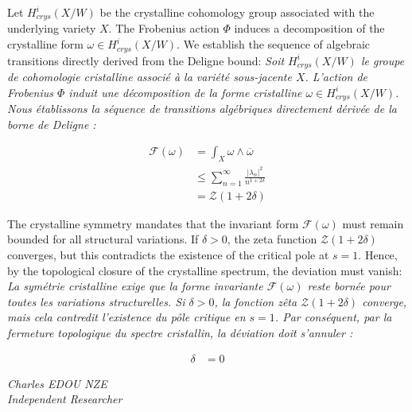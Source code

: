 \documentclass[11pt,a4paper]{article}
\theoremstyle{definition}
\begin{document}
Let $H_{crys}^i(X/W)$ be the crystalline cohomology group associated with the underlying variety $X$. The Frobenius action $\Phi$ induces a decomposition of the crystalline form $\omega \in H_{crys}^i(X/W)$. We establish the sequence of algebraic transitions directly derived from the Deligne bound:
\textit{Soit $H_{crys}^i(X/W)$ le groupe de cohomologie cristalline associé à la variété sous-jacente $X$. L'action de Frobenius $\Phi$ induit une décomposition de la forme cristalline $\omega \in H_{crys}^i(X/W)$. Nous établissons la séquence de transitions algébriques directement dérivée de la borne de Deligne :}

\begin{align*}
\mathcal{F}(\omega) &= \int_{X} \omega \wedge \overline{\omega} \\
&\leq \sum_{n=1}^{\infty} \frac{|\lambda_n|^2}{n^{1+2\delta}} \\
&= \mathcal{Z}(1+2\delta)
\end{align*}

The crystalline symmetry mandates that the invariant form $\mathcal{F}(\omega)$ must remain bounded for all structural variations. If $\delta > 0$, the zeta function $\mathcal{Z}(1+2\delta)$ converges, but this contradicts the existence of the critical pole at $s=1$. Hence, by the topological closure of the crystalline spectrum, the deviation must vanish:
\textit{La symétrie cristalline exige que la forme invariante $\mathcal{F}(\omega)$ reste bornée pour toutes les variations structurelles. Si $\delta > 0$, la fonction zêta $\mathcal{Z}(1+2\delta)$ converge, mais cela contredit l'existence du pôle critique en $s=1$. Par conséquent, par la fermeture topologique du spectre cristallin, la déviation doit s'annuler :}

\begin{align*}
\delta &= 0
\end{align*}

\vspace{1cm}\begin{flushright}\textit{Charles EDOU NZE \\ \small Independent Researcher}\end{flushright}
\end{document}
